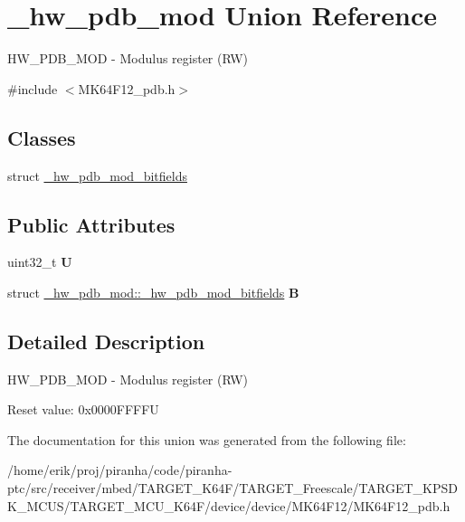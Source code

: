 \hypertarget{union__hw__pdb__mod}{}\section{\+\_\+hw\+\_\+pdb\+\_\+mod Union Reference}
\label{union__hw__pdb__mod}


H\+W\+\_\+\+P\+D\+B\+\_\+\+M\+OD -\/ Modulus register (RW)  




{\ttfamily \#include $<$M\+K64\+F12\+\_\+pdb.\+h$>$}

\subsection*{Classes}
\begin{DoxyCompactItemize}
\item 
struct \hyperlink{struct__hw__pdb__mod_1_1__hw__pdb__mod__bitfields}{\+\_\+hw\+\_\+pdb\+\_\+mod\+\_\+bitfields}
\end{DoxyCompactItemize}
\subsection*{Public Attributes}
\begin{DoxyCompactItemize}
\item 
uint32\+\_\+t {\bfseries U}\hypertarget{union__hw__pdb__mod_a53f49efff963cdef3c94783968948dc6}{}\label{union__hw__pdb__mod_a53f49efff963cdef3c94783968948dc6}

\item 
struct \hyperlink{struct__hw__pdb__mod_1_1__hw__pdb__mod__bitfields}{\+\_\+hw\+\_\+pdb\+\_\+mod\+::\+\_\+hw\+\_\+pdb\+\_\+mod\+\_\+bitfields} {\bfseries B}\hypertarget{union__hw__pdb__mod_acff0f719d33039ef92d6724667f5f8ec}{}\label{union__hw__pdb__mod_acff0f719d33039ef92d6724667f5f8ec}

\end{DoxyCompactItemize}


\subsection{Detailed Description}
H\+W\+\_\+\+P\+D\+B\+\_\+\+M\+OD -\/ Modulus register (RW) 

Reset value\+: 0x0000\+F\+F\+F\+FU 

The documentation for this union was generated from the following file\+:\begin{DoxyCompactItemize}
\item 
/home/erik/proj/piranha/code/piranha-\/ptc/src/receiver/mbed/\+T\+A\+R\+G\+E\+T\+\_\+\+K64\+F/\+T\+A\+R\+G\+E\+T\+\_\+\+Freescale/\+T\+A\+R\+G\+E\+T\+\_\+\+K\+P\+S\+D\+K\+\_\+\+M\+C\+U\+S/\+T\+A\+R\+G\+E\+T\+\_\+\+M\+C\+U\+\_\+\+K64\+F/device/device/\+M\+K64\+F12/M\+K64\+F12\+\_\+pdb.\+h\end{DoxyCompactItemize}
